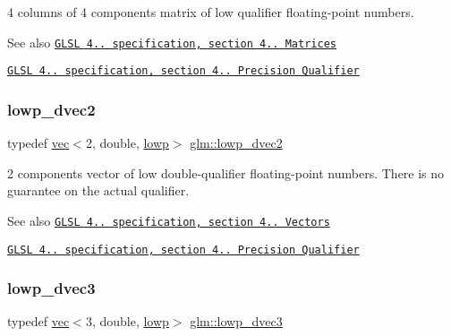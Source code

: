 4 columns of 4 components matrix of low qualifier floating-\/point numbers.

\begin{DoxySeeAlso}{See also}
\href{http://www.opengl.org/registry/doc/GLSLangSpec.4.20.8.pdf}{\tt G\+L\+SL 4.. specification, section 4.. Matrices} 

\href{http://www.opengl.org/registry/doc/GLSLangSpec.4.20.8.pdf}{\tt G\+L\+SL 4.. specification, section 4.. Precision Qualifier} 
\end{DoxySeeAlso}
\mbox{\label{group__core__precision_gab2db907304a5b726a369c351e02357fe}} 
\subsubsection{\texorpdfstring{lowp\+\_\+dvec2}{lowp\_dvec2}}
{\footnotesize\ttfamily typedef \hyperlink{structglm_1_1vec}{vec}$<$2, double, \hyperlink{namespaceglm_a36ed105b07c7746804d7fdc7cc90ff25ae161af3fc695e696ce3bf69f7332bc2d}{lowp}$>$ \hyperlink{group__core__precision_gab2db907304a5b726a369c351e02357fe}{glm\+::lowp\+\_\+dvec2}}

2 components vector of low double-\/qualifier floating-\/point numbers. There is no guarantee on the actual qualifier.

\begin{DoxySeeAlso}{See also}
\href{http://www.opengl.org/registry/doc/GLSLangSpec.4.20.8.pdf}{\tt G\+L\+SL 4.. specification, section 4.. Vectors} 

\href{http://www.opengl.org/registry/doc/GLSLangSpec.4.20.8.pdf}{\tt G\+L\+SL 4.. specification, section 4.. Precision Qualifier} 
\end{DoxySeeAlso}
\mbox{\label{group__core__precision_gaf59ddbed824c80439be0a04a1a46d520}} 
\subsubsection{\texorpdfstring{lowp\+\_\+dvec3}{lowp\_dvec3}}
{\footnotesize\ttfamily typedef \hyperlink{structglm_1_1vec}{vec}$<$3, double, \hyperlink{namespaceglm_a36ed105b07c7746804d7fdc7cc90ff25ae161af3fc695e696ce3bf69f7332bc2d}{lowp}$>$ \hyperlink{group__core__precision_gaf59ddbed824c80439be0a04a1a46d520}{glm\+::lowp\+\_\+dvec3}}


